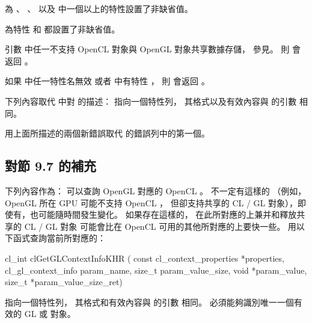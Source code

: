 \item 為 、 、
  以及  中一個以上的特性設置了非缺省值。

\item 為特性  和  都設置了非缺省值。

\item 引數  中任一不支持 OpenCL 對象與 OpenGL 對象共享數據存儲，
參見。
\stopigBase
則  會返回 。

如果  中任一特性名無效
或者  中有特性 ，
則  會返回 。
\stopreplacepar

下列內容取代  中對  的描述：
\startreplacepar
{} 指向一個特性列，
其格式以及有效內容與  的引數  相同。
\stopreplacepar

用上面所描述的兩個新錯誤取代  的錯誤列中的第一個。

\subsection{對節 9.7 的補充}

下列內容作為{}：
\startreplacepar
可以查詢 OpenGL 對應的 OpenCL 。
不一定有這樣的
（例如， OpenGL 所在 GPU 可能不支持 OpenCL ，
但卻支持共享的 CL / GL 對象），即使有，也可能隨時間發生變化。
如果存在這樣的，
在此所對應的上兼并和釋放共享的 CL / GL 對象
可能會比在 OpenCL 可用的其他所對應的上要快一些。
用以下函式查詢當前所對應的：


\startCLFUNC
cl_int clGetGLContextInfoKHR (
		const cl_context_properties *properties,
		cl_gl_context_info param_name,
		size_t param_value_size,
		void *param_value,
		size_t *param_value_size_ret)
\stopCLFUNC

 指向一個特性列，
其格式和有效內容與  的引數  相同。
 必須能夠識別唯一一個有效的 GL 或 對象。

